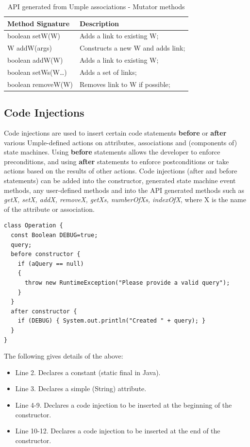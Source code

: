 \begin{table}[h]
\centering
 \caption{API generated from Umple associations - Mutator methods \cite{UmpleAPI}}
\label{table:apiAssocs2}
\begin{tabular}{l|l}
\toprule
\rowcolor[HTML]{BBDAFF}
\textbf{Method Signature} & \textbf{Description}     \\ \midrule
boolean setW(W)   & Adds a link to existing W;	\\ 
W addW(args)    & Constructs a new W and adds link;      \\ 
boolean addW(W)  & Adds a link to existing W;            \\ 
boolean setWs(W…)    & Adds a set of links;              \\ 
 boolean removeW(W) &   Removes link to W if possible;   \\
 \bottomrule
\end{tabular}
\end{table}

\subsection{Code Injections}
Code injections are used to insert certain code statements \textbf{before} or \textbf{after} various Umple-defined actions on attributes, associations and (components of) state machines. Using \textbf{before} statements allows the developer to enforce preconditions, and using \textbf{after} statements to enforce postconditions or take actions based on the results of other actions. Code injections (after and before statements) can be added into the constructor, generated state machine event methods, any user-defined methods and into the API generated methods such as \textit{getX, setX, addX, removeX, getXs, numberOfXs, indexOfX}, where X is the name of the attribute or association.

\begin{lstlisting}[style=umpleOut,label={lst:codeInjection},caption=A code injection into the constructor]
class Operation {  
  const Boolean DEBUG=true;  
  query;  
  before constructor {  
    if (aQuery == null)  
    {  
      throw new RuntimeException("Please provide a valid query");  
    }  
  }  
  after constructor {  
    if (DEBUG) { System.out.println("Created " + query); }  
  }  
}  
\end{lstlisting}

The following gives details of the above:
\begin{itemize}
\item Line 2. Declares a constant (static final in Java). 
\item Line 3. Declares a simple (String) attribute.   	 
\item Line 4-9. Declares a code injection to be inserted at the beginning of the constructor.  
\item Line 10-12. Declares a code injection to be inserted at the end of the constructor.      
\end{itemize}

